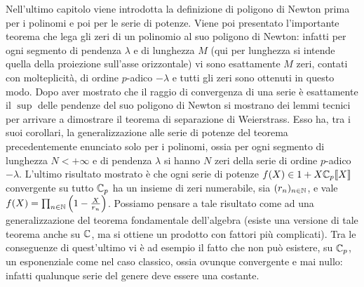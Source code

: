 	Nell'ultimo capitolo viene introdotta la definizione di poligono di Newton prima per i polinomi e poi per le serie di potenze. Viene poi presentato l'importante teorema che lega gli zeri di un polinomio al suo poligono di Newton: infatti per ogni segmento di pendenza $\lambda$ e di lunghezza $M$ (qui per lunghezza si intende quella della proiezione sull'asse orizzontale) vi sono esattamente $M$ zeri, contati con molteplicità, di ordine $p$-adico $-\lambda$ e tutti gli zeri sono ottenuti in questo modo. Dopo aver mostrato che il raggio di convergenza di una serie è esattamente il $\sup$ delle pendenze del suo poligono di Newton si mostrano dei lemmi tecnici per arrivare a dimostrare il teorema di separazione di Weierstrass. Esso ha, tra i suoi corollari, la generalizzazione alle serie di potenze del teorema precedentemente enunciato solo per i polinomi, ossia per ogni segmento di lunghezza $N < +\infty$ e di pendenza $\lambda$ si hanno $N$ zeri della serie di ordine $p$-adico $-\lambda$. L'ultimo risultato mostrato è che ogni serie di potenze $f(X) \in 1 + X\mathbb{C}_p\llbracket {X} \rrbracket$ convergente su tutto $\mathbb{C}_p$ ha un insieme di zeri numerabile, sia $(r_n)_{n \in \mathbb{N}}$, e vale $f(X) = \prod_{n \in \mathbb{N}} \left(1 - \tfrac{X}{r_n}\right)$. Possiamo pensare a tale risultato come ad una generalizzazione del teorema fondamentale dell'algebra (esiste una versione di tale teorema anche su $\mathbb{C}$, ma si ottiene un prodotto con fattori più complicati). Tra le conseguenze di quest'ultimo vi è ad esempio il fatto che non può esistere, su $\mathbb{C}_p$, un esponenziale come nel caso classico, ossia ovunque convergente e mai nullo: infatti qualunque serie del genere deve essere una costante.